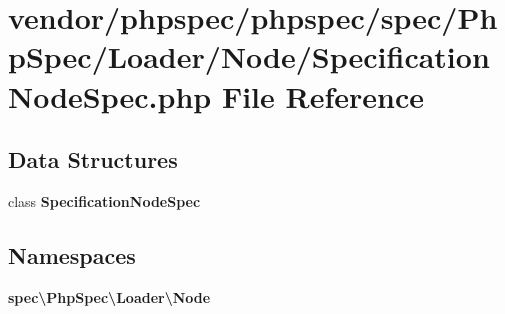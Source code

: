 \section{vendor/phpspec/phpspec/spec/\+Php\+Spec/\+Loader/\+Node/\+Specification\+Node\+Spec.php File Reference}
\label{_specification_node_spec_8php}
\subsection*{Data Structures}
\begin{DoxyCompactItemize}
\item 
class {\bf Specification\+Node\+Spec}
\end{DoxyCompactItemize}
\subsection*{Namespaces}
\begin{DoxyCompactItemize}
\item 
 {\bf spec\textbackslash{}\+Php\+Spec\textbackslash{}\+Loader\textbackslash{}\+Node}
\end{DoxyCompactItemize}
